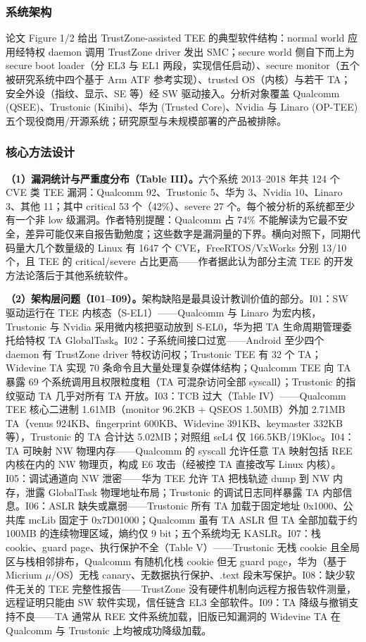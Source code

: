 \documentclass[11pt]{ctexart}
\begin{document}
\subsubsection{系统架构}
论文 Figure 1/2 给出 TrustZone-assisted TEE 的典型软件结构：normal world 应用经特权 daemon 调用 TrustZone driver 发出 SMC；secure world 侧自下而上为 secure boot loader（分 EL3 与 EL1 两段，实现信任启动）、secure monitor（五个被研究系统中四个基于 Arm ATF 参考实现）、trusted OS（内核）与若干 TA；安全外设（指纹、显示、SE 等）经 SW 驱动接入。分析对象覆盖 Qualcomm (QSEE)、Trustonic (Kinibi)、华为 (Trusted Core)、Nvidia 与 Linaro (OP-TEE) 五个现役商用/开源系统；研究原型与未规模部署的产品被排除。\par
\subsubsection{核心方法设计}
\noindent\textbf{（1）漏洞统计与严重度分布（Table III）。}六个系统 2013--2018 年共 124 个 CVE 类 TEE 漏洞：Qualcomm 92、Trustonic 5、华为 3、Nvidia 10、Linaro 3、其他 11；其中 critical 53 个（42\%）、severe 27 个。每个被分析的系统都至少有一个非 low 级漏洞。作者特别提醒：Qualcomm 占 74\% 不能解读为它最不安全，差异可能仅来自报告勤勉度；这些数字是漏洞量的下界。横向对照下，同期代码量大几个数量级的 Linux 有 1647 个 CVE，FreeRTOS/VxWorks 分别 13/10 个，且 TEE 的 critical/severe 占比更高——作者据此认为部分主流 TEE 的开发方法论落后于其他系统软件。\par
\noindent\textbf{（2）架构层问题（I01--I09）。}架构缺陷是最具设计教训价值的部分。I01：SW 驱动运行在 TEE 内核态（S-EL1）——Qualcomm 与 Linaro 为宏内核，Trustonic 与 Nvidia 采用微内核把驱动放到 S-EL0，华为把 TA 生命周期管理委托给特权 TA GlobalTask。I02：子系统间接口过宽——Android 至少四个 daemon 有 TrustZone driver 特权访问权；Trustonic TEE 有 32 个 TA；Widevine TA 实现 70 条命令且大量处理复杂媒体结构；Qualcomm TEE 向 TA 暴露 69 个系统调用且权限粒度粗（TA 可混杂访问全部 syscall）；Trustonic 的指纹驱动 TA 几乎对所有 TA 开放。I03：TCB 过大（Table IV）——Qualcomm TEE 核心二进制 1.61MB（monitor 96.2KB + QSEOS 1.50MB）外加 2.71MB TA（venus 924KB、fingerprint 600KB、Widevine 391KB、keymaster 332KB 等），Trustonic 的 TA 合计达 5.02MB；对照组 seL4 仅 166.5KB/19Kloc。I04：TA 可映射 NW 物理内存——Qualcomm 的 syscall 允许任意 TA 映射包括 REE 内核在内的 NW 物理页，构成 E6 攻击（经被控 TA 直接改写 Linux 内核）。I05：调试通道向 NW 泄密——华为 TEE 允许 TA 把栈轨迹 dump 到 NW 内存，泄露 GlobalTask 物理地址布局；Trustonic 的调试日志同样暴露 TA 内部信息。I06：ASLR 缺失或羸弱——Trustonic 所有 TA 加载于固定地址 0x1000、公共库 mcLib 固定于 0x7D01000；Qualcomm 虽有 TA ASLR 但 TA 全部加载于约 100MB 的连续物理区域，熵约仅 9 bit；五个系统均无 KASLR。I07：栈 cookie、guard page、执行保护不全（Table V）——Trustonic 无栈 cookie 且全局区与栈相邻排布，Qualcomm 有随机化栈 cookie 但无 guard page，华为（基于 Micrium $\mu$/OS）无栈 canary、无数据执行保护、.text 段未写保护。I08：缺少软件无关的 TEE 完整性报告——TrustZone 没有硬件机制向远程方报告软件测量，远程证明只能由 SW 软件实现，信任链含 EL3 全部软件。I09：TA 降级与撤销支持不良——TA 通常从 REE 文件系统加载，旧版已知漏洞的 Widevine TA 在 Qualcomm 与 Trustonic 上均被成功降级加载。\par
\end{document}
